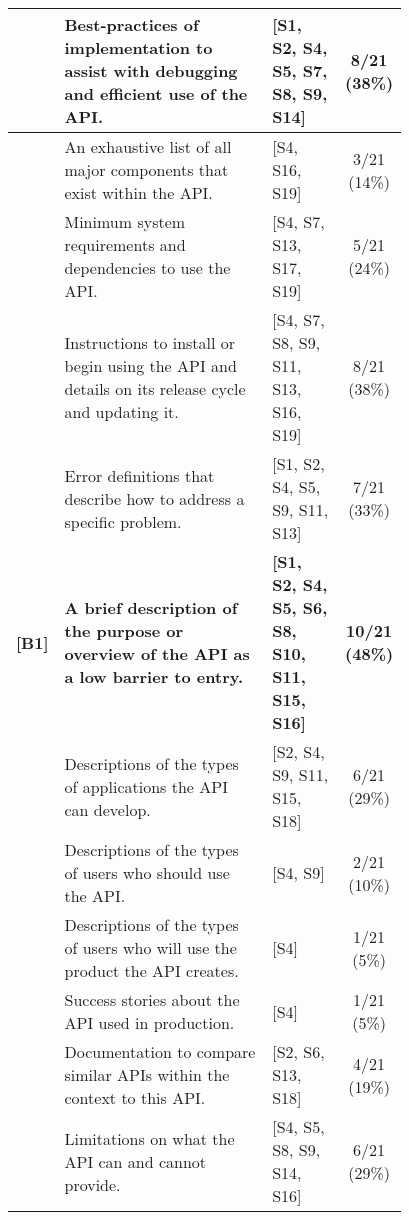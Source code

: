 \begin{table*}[hbt]
\begin{tabular}{|rp{0.58\linewidth}||p{0.2\linewidth}|c|}
    \hline
    [A8]&
    Best-practices of implementation to assist with debugging and efficient use of the API.
    &
    [S1, S2, S4, S5, S7, S8, S9, S14] &
    8/21 (38\%)\\

    \hline
    [A9]&
    An exhaustive list of all major components that exist within the API.
    &
    [S4, S16, S19] &
    3/21 (14\%)\\

    \hline
    [A10]&
    Minimum system requirements and dependencies to use the API.
    &
    [S4, S7, S13, S17, S19] &
    5/21 (24\%)\\

    \hline
    [A11]&
    Instructions to install or begin using the API and details on its release cycle and updating it.
    &
    [S4, S7, S8, S9, S11, S13, S16, S19] &
    8/21 (38\%)\\

    \hline
    [A12]&
    Error definitions that describe how to address a specific problem.
    &
    [S1, S2, S4, S5, S9, S11, S13] &
    7/21 (33\%)\\

    \hline
    \hline
    \textbf{[B1]}&
    \textbf{A brief description of the purpose or overview of the API as a low barrier to entry.}
    &
    \textbf{[S1, S2, S4, S5, S6, S8, S10, S11, S15, S16]} &
    \textbf{10/21 (48\%)}\\

    \hline
    [B2]&
    Descriptions of the types of applications the API can develop.
    &
    [S2, S4, S9, S11, S15, S18] &
    6/21 (29\%)\\

    \hline
    [B3]&
    Descriptions of the types of users who should use the API.
    &
    [S4, S9] &
    2/21 (10\%)\\

    \hline
    [B4]&
    Descriptions of the types of users who will use the product the API creates.
    &
    [S4] &
    1/21 (5\%)\\

    \hline
    [B5]&
    Success stories about the API used in production.
    &
    [S4] &
    1/21 (5\%)\\

    \hline
    [B6]&
    Documentation to compare similar APIs within the context to this API.
    &
    [S2, S6, S13, S18] &
    4/21 (19\%)\\

    \hline
    [B7]&
    Limitations on what the API can and cannot provide.
    &
    [S4, S5, S8, S9, S14, S16] &
    6/21 (29\%)\\


\end{tabular}
\end{table*}
